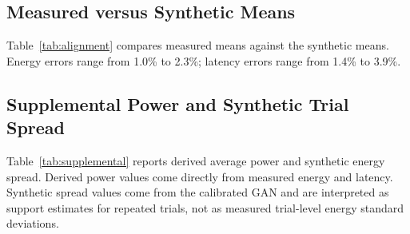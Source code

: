 \documentclass{svproc}
\begin{document}
\subsection{Measured versus Synthetic Means}
Table~\ref{tab:alignment} compares measured means against the synthetic means.
Energy errors range from 1.0\% to 2.3\%; latency errors range from 1.4\% to
3.9\%.

\begin{table}[ht]
\centering
\caption{Measured versus paper-aligned synthetic mean metrics.}
\label{tab:alignment}
\end{table}

\subsection{Supplemental Power and Synthetic Trial Spread}
Table~\ref{tab:supplemental} reports derived average power and synthetic
energy spread. Derived power values come directly from measured energy and
latency. Synthetic spread values come from the calibrated GAN and are
interpreted as support estimates for repeated trials, not as measured
trial-level energy standard deviations.

\begin{table}[ht]
\centering
\caption{Supplemental power and synthetic trial-spread estimates. Model abbreviations match Fig.~\ref{fig:measured-energy}.}
\label{tab:supplemental}
\small
{}
\end{table}
\end{document}
